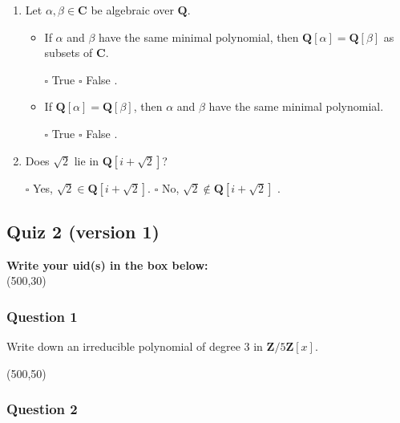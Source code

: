 \documentclass[11pt]{article}
\begin{document}
\begin{enumerate}
\item Let \(\alpha, \beta \in \mathbf{C}\) be algebraic over \(\mathbf{Q}\).

\begin{itemize}
\item If \(\alpha\) and \(\beta\) have the same minimal polynomial, then \(\mathbf{Q}[\alpha] = \mathbf{Q}[\beta]\) as subsets of \(\mathbf{C}\).

\bigskip

\(\square\) True \hfill \(\square\) False \hfill.

\bigskip

\item If \(\mathbf{Q}[\alpha] = \mathbf{Q}[\beta]\), then \(\alpha\) and \(\beta\) have the same minimal polynomial.

\bigskip

\(\square\) True \hfill \(\square\) False \hfill.

\bigskip
\end{itemize}

\item Does \(\sqrt 2\) lie in \(\mathbf{Q}[i + \sqrt 2]\)?

\bigskip

\(\square\) Yes, \(\sqrt 2 \in \mathbf{Q}[i+\sqrt 2]\). \hfill \(\square\) No, \(\sqrt 2 \not\in \mathbf{Q}[i+\sqrt 2]\) \hfill.

\bigskip
\end{enumerate}
\subsection{Quiz 2 (version 1)}
\label{sec:orgf53f9fe}
\vspace{1cm}

\noindent
\textbf{Write your uid(s) in the box below:}\\
\framebox(500,30)

\vspace{1cm}
\subsubsection{Question 1}
\label{sec:org5f9935d}

Write down an irreducible polynomial of degree 3 in \(\mathbf{Z}/5 \mathbf{Z}[x]\).

\noindent
\framebox(500,50)

\vspace{1cm}
\subsubsection{Question 2}
\label{sec:orgfd83f65}
\end{document}
